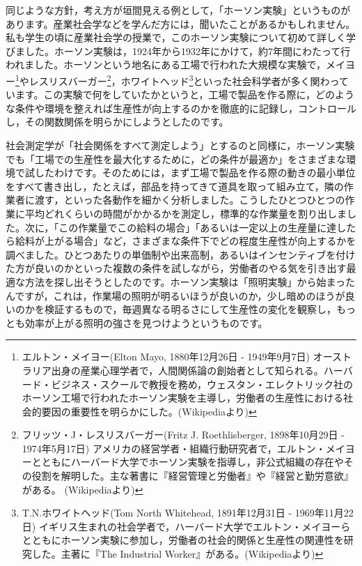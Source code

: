 \documentclass{ltjsbook}
\begin{document}
同じような方針，考え方が垣間見える例として，「ホーソン実験」というものがあります。産業社会学などを学んだ方には，聞いたことがあるかもしれません。私も学生の頃に産業社会学の授業で，このホーソン実験について初めて詳しく学びました。ホーソン実験は，1924年から1932年にかけて，約7年間にわたって行われました。ホーソンという地名にある工場で行われた大規模な実験で，メイヨー\footnote{エルトン・メイヨー(Elton Mayo, 1880年12月26日 - 1949年9月7日)  オーストラリア出身の産業心理学者で，人間関係論の創始者として知られる。ハーバード・ビジネス・スクールで教授を務め，ウェスタン・エレクトリック社のホーソン工場で行われたホーソン実験を主導し，労働者の生産性における社会的要因の重要性を明らかにした。(Wikipediaより)}やレスリスバーガー\footnote{フリッツ・J・レスリスバーガー(Fritz J. Roethlisberger, 1898年10月29日 - 1974年5月17日)  アメリカの経営学者・組織行動研究者で，エルトン・メイヨーとともにハーバード大学でホーソン実験を指導し，非公式組織の存在やその役割を解明した。主な著書に『経営管理と労働者』や『経営と勤労意欲』がある。 (Wikipediaより)}，ホワイトヘッド\footnote{T.N.ホワイトヘッド(Tom North Whitehead, 1891年12月31日 - 1969年11月22日)  イギリス生まれの社会学者で，ハーバード大学でエルトン・メイヨーらとともにホーソン実験に参加し，労働者の社会的関係と生産性の関連性を研究した。主著に『The Industrial Worker』がある。(Wikipediaより)}といった社会科学者が多く関わっています。この実験で何をしていたかというと，工場で製品を作る際に，どのような条件や環境を整えれば生産性が向上するのかを徹底的に記録し，コントロールし，その関数関係を明らかにしようとしたのです。

社会測定学が「社会関係をすべて測定しよう」とするのと同様に，ホーソン実験でも「工場での生産性を最大化するために，どの条件が最適か」をさまざまな環境で試したわけです。そのためには，まず工場で製品を作る際の動きの最小単位をすべて書き出し，たとえば，部品を持ってきて道具を取って組み立て，隣の作業者に渡す，といった各動作を細かく分析しました。こうしたひとつひとつの作業に平均どれくらいの時間がかかるかを測定し，標準的な作業量を割り出しました。次に，「この作業量でこの給料の場合」「あるいは一定以上の生産量に達したら給料が上がる場合」など，さまざまな条件下でどの程度生産性が向上するかを調べました。ひとつあたりの単価制や出来高制，あるいはインセンティブを付けた方が良いのかといった複数の条件を試しながら，労働者のやる気を引き出す最適な方法を探し出そうとしたのです。ホーソン実験は「照明実験」から始まったんですが，これは，作業場の照明が明るいほうが良いのか，少し暗めのほうが良いのかを検証するもので，毎週異なる明るさにして生産性の変化を観察し，もっとも効率が上がる照明の強さを見つけようというものです。
\end{document}
